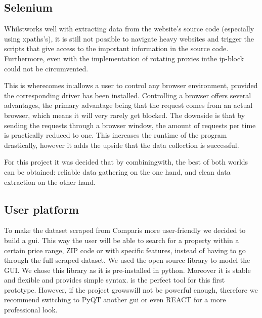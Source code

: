 \documentclass[main]{subfiles}
\begin{document}
\subsection{Selenium}
Whilst\pkg[Scrapy] works well with extracting data from the website's source code (especially using \acsp*{xpath}'s), 
it is still not possible to navigate \js heavy websites and trigger the scripts that give access to the important information in the source code.
Furthermore, even with the implementation of rotating proxies in\pkg[Scrapy,]\hspace{-5pt}the \acs*{ip}-block could not be circumvented.

This is where\pkg[Selenium]\hspace{-5pt}comes in:\pkg[Selenium] allows a user to control any browser environment,
provided the corresponding driver has been installed.
Controlling a browser offers several advantages, the primary advantage being that the request comes from an actual browser,
which means it will very rarely get blocked. 
The downside is that by sending the requests through a browser window, 
the amount of requests per time is practically reduced to one.
This increases the runtime of the program drastically, 
however it adds the upside that the data collection is successful.

For this project it was decided that by combining\pkg[Selenium] with\pkg[Scrapy], the best of both worlds can be obtained:
reliable data gathering on the one hand, and clean data extraction on the other hand.


\subsection{User platform}
To make the dataset scraped from Comparis more user-friendly we decided to build a \ac{gui}.
This way the user will be able to search for a property within a certain price range, ZIP code or with specific features, 
instead of having to go through the full scraped dataset.
We used the open source library\pkg[tkinter] \cite{TkinterPythonInterface} 
to model the GUI. We chose this library as it is pre-installed in python.
Moreover it is stable and flexible and provides simple syntax.
\pkg[tkinter] is the perfect tool for this first prototype. However, if the project grows\pkg[tkinter] will not be powerful enough,
therefore we recommend switching to PyQT another \ac{gui} or even REACT for a more professional look. 
\end{document}
